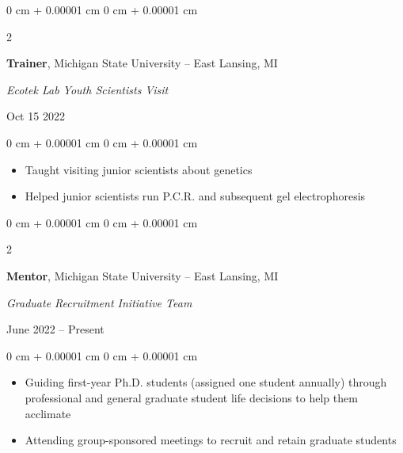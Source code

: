 \documentclass[10pt, letterpaper]{article}
\newenvironment{highlights}{
    \begin{itemize}[
        topsep=0.10 cm,
        parsep=0.10 cm,
        partopsep=0pt,
        itemsep=0pt,
        leftmargin=0 cm + 10pt
    ]
}{
    \end{itemize}
} %
\newenvironment{onecolentry}{
    \begin{adjustwidth}{
        0 cm + 0.00001 cm
    }{
        0 cm + 0.00001 cm
    }
}{
    \end{adjustwidth}
} %
\newenvironment{twocolentry}[2][]{
    \onecolentry
    \def\secondColumn{#2}
    \setcolumnwidth{\fill, 4.5 cm}
    \begin{paracol}{2}
}{
    \switchcolumn \raggedleft \secondColumn
    \end{paracol}
    \endonecolentry
} %
\begin{document}
        \vspace{0.2 cm}


        \begin{samepage} 
            \begin{twocolentry}{
                Oct 15 2022
                }
                \textbf{Trainer}, Michigan State University -- East Lansing, MI
                
                \vspace{0.05 cm}

                \textit{Ecotek Lab Youth Scientists Visit}
            \end{twocolentry}
        \end{samepage}
        
        \vspace{0.10 cm}
        
        \begin{onecolentry}
            \begin{highlights}
                \item Taught visiting junior scientists about genetics
                \item Helped junior scientists run P.C.R. and subsequent gel electrophoresis
            \end{highlights}
        \end{onecolentry}

        \vspace{0.2 cm}


        \begin{samepage} 
            \begin{twocolentry}{
                June 2022 – Present
                }
                \textbf{Mentor}, Michigan State University -- East Lansing, MI
                
                \vspace{0.05 cm}

                \textit{Graduate Recruitment Initiative Team}
            \end{twocolentry}
        \end{samepage}         

        \vspace{0.10 cm}
        
        \begin{onecolentry}
            \begin{highlights}       
                \item Guiding first-year Ph.D. students (assigned one student annually) through professional and general graduate student life decisions to help them acclimate
                \item Attending group-sponsored meetings to recruit and retain graduate students
            \end{highlights}
        \end{onecolentry}
\end{document}
